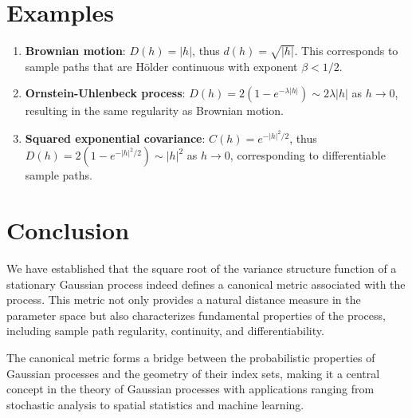 \documentclass{article}
\theoremstyle{plain}
\theoremstyle{definition}
\begin{document}
\section{Examples}

\begin{enumerate}
    \item \textbf{Brownian motion}: $D(h) = |h|$, thus $d(h) = \sqrt{|h|}$. This corresponds to sample paths that are Hölder continuous with exponent $\beta < 1/2$.
    
    \item \textbf{Ornstein-Uhlenbeck process}: $D(h) = 2(1 - e^{-\lambda|h|}) \sim 2\lambda|h|$ as $h \to 0$, resulting in the same regularity as Brownian motion.
    
    \item \textbf{Squared exponential covariance}: $C(h) = e^{-|h|^2/2}$, thus $D(h) = 2(1 - e^{-|h|^2/2}) \sim |h|^2$ as $h \to 0$, corresponding to differentiable sample paths.
\end{enumerate}

\section{Conclusion}

We have established that the square root of the variance structure function of a stationary Gaussian process indeed defines a canonical metric associated with the process. This metric not only provides a natural distance measure in the parameter space but also characterizes fundamental properties of the process, including sample path regularity, continuity, and differentiability.

The canonical metric forms a bridge between the probabilistic properties of Gaussian processes and the geometry of their index sets, making it a central concept in the theory of Gaussian processes with applications ranging from stochastic analysis to spatial statistics and machine learning.
\end{document}

